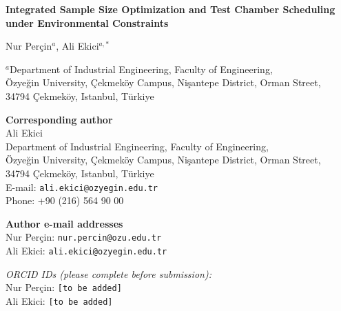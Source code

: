 \documentclass[11pt]{article}
\begin{document}
\begin{center}
{\Large\bfseries Integrated Sample Size Optimization and Test Chamber Scheduling under Environmental Constraints}
\end{center}

\vspace{1.2em}

\begin{center}
Nur Per\c{c}in$^{a}$,
Ali Ekici$^{a,*}$
\end{center}

\vspace{0.8em}

\begin{center}
\begin{minipage}{0.92\textwidth}
\footnotesize
$^{a}$Department of Industrial Engineering, Faculty of Engineering,\\
\"{O}zye\u{g}in University, \c{C}ekmek\"{o}y Campus, Ni\c{s}antepe District, Orman Street,\\
34794 \c{C}ekmek\"{o}y, Istanbul, T\"{u}rkiye
\end{minipage}
\end{center}

\vspace{1.2em}

\noindent
\textbf{Corresponding author}\\[0.35em]
Ali Ekici\\
Department of Industrial Engineering, Faculty of Engineering,\\
\"{O}zye\u{g}in University, \c{C}ekmek\"{o}y Campus, Ni\c{s}antepe District, Orman Street,\\
34794 \c{C}ekmek\"{o}y, Istanbul, T\"{u}rkiye\\
E-mail: \texttt{ali.ekici@ozyegin.edu.tr}\\
Phone: +90 (216) 564 90 00

\vspace{0.8em}

\noindent
\textbf{Author e-mail addresses}\\[0.35em]
Nur Per\c{c}in: \texttt{nur.percin@ozu.edu.tr}\\
Ali Ekici: \texttt{ali.ekici@ozyegin.edu.tr}

\vspace{0.6em}

\noindent
\textit{ORCID IDs (please complete before submission):}\\
Nur Per\c{c}in: \texttt{[to be added]}\\
Ali Ekici: \texttt{[to be added]}
\end{document}
